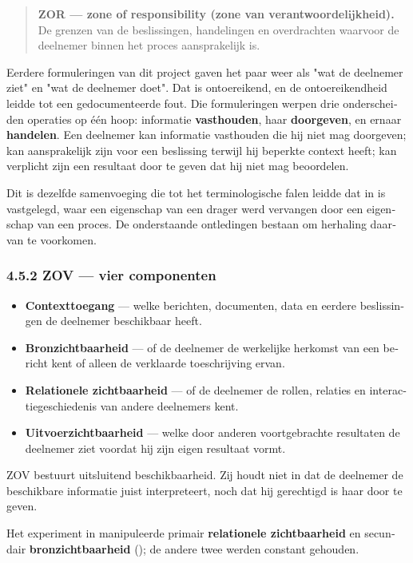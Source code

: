 \begin{dutch}
\begin{quote}
\textbf{ZOR — zone of responsibility (zone van verantwoordelijkheid).} De grenzen van de beslissingen, handelingen en overdrachten waarvoor de deelnemer binnen het proces aansprakelijk is.
\end{quote}
Eerdere formuleringen van dit project gaven het paar weer als "wat de deelnemer ziet" en "wat de deelnemer doet". Dat is ontoereikend, en de ontoereikendheid leidde tot een gedocumenteerde fout. Die formuleringen werpen drie onderscheiden operaties op één hoop: informatie \textbf{vasthouden}, haar \textbf{doorgeven}, en ernaar \textbf{handelen}. Een deelnemer kan informatie vasthouden die hij niet mag doorgeven; kan aansprakelijk zijn voor een beslissing terwijl hij beperkte context heeft; kan verplicht zijn een resultaat door te geven dat hij niet mag beoordelen.

Dit is dezelfde samenvoeging die tot het terminologische falen leidde dat in  is vastgelegd, waar een eigenschap van een drager werd vervangen door een eigenschap van een proces. De onderstaande ontledingen bestaan om herhaling daarvan te voorkomen.


\subsubsection*{4.5.2 ZOV — vier componenten}
\label{sec:nl:4.5.2}

\begin{itemize}
  \item \textbf{Contexttoegang} — welke berichten, documenten, data en eerdere beslissingen de deelnemer beschikbaar heeft.
  \item \textbf{Bronzichtbaarheid} — of de deelnemer de werkelijke herkomst van een bericht kent of alleen de verklaarde toeschrijving ervan.
  \item \textbf{Relationele zichtbaarheid} — of de deelnemer de rollen, relaties en interactiegeschiedenis van andere deelnemers kent.
  \item \textbf{Uitvoerzichtbaarheid} — welke door anderen voortgebrachte resultaten de deelnemer ziet voordat hij zijn eigen resultaat vormt.
\end{itemize}
ZOV bestuurt uitsluitend beschikbaarheid. Zij houdt niet in dat de deelnemer de beschikbare informatie juist interpreteert, noch dat hij gerechtigd is haar door te geven.

Het experiment in  manipuleerde primair \textbf{relationele zichtbaarheid} en secundair \textbf{bronzichtbaarheid} (); de andere twee werden constant gehouden.



\end{dutch}
